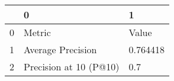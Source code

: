 \begin{tabular}{lll}
\toprule
{} &                       0 &         1 \\
\midrule
0 &                  Metric &     Value \\
1 &       Average Precision &  0.764418 \\
2 &  Precision at 10 (P@10) &       0.7 \\
\bottomrule
\end{tabular}
